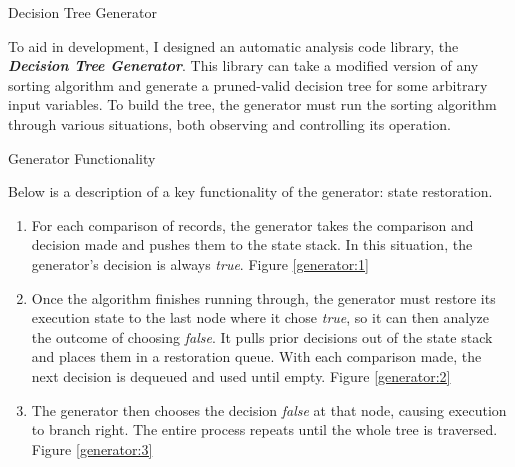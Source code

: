 \documentclass[final]{beamer}
\newlength{\onecolwid}
\begin{document}
\begin{frame}[t]
\begin{columns}[t]
\begin{column}{\onecolwid}
\begin{block}{Decision Tree Generator}

To aid in development, I designed an automatic analysis code library, the \textit{\textbf{Decision
Tree Generator}}. This library can take a modified version of any sorting algorithm and generate a
pruned-valid decision tree for some arbitrary input variables. To build the tree, the generator must
run the sorting algorithm through various situations, both observing and controlling its operation.

\end{block}


\begin{block}{Generator Functionality}

Below is a description of a key functionality of the generator: state restoration.

\begin{enumerate}
\item For each comparison of records, the generator takes the comparison and decision made and
    pushes them to the state stack. In this situation, the generator's decision is always
    \textit{true}. Figure \ref{generator:1}
\item Once the algorithm finishes running through, the generator must restore its execution state to
    the last node where it chose \textit{true}, so it can then analyze the outcome of choosing
    \textit{false}. It pulls prior decisions out of the state stack and places them in a restoration
    queue. With each comparison made, the next decision is dequeued and used until empty. Figure
    \ref{generator:2}
\item The generator then chooses the decision \textit{false} at that node, causing execution to
branch right. The entire process repeats until the whole tree is traversed. Figure \ref{generator:3}
\end{enumerate}

\end{block}




\end{column}
\end{columns}
\end{frame}
\end{document}
